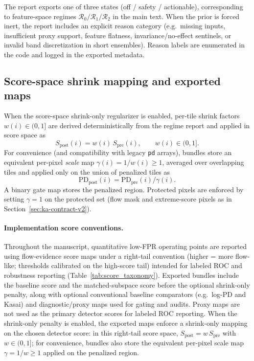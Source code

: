 \documentclass[11pt]{article}
\DeclareRobustCommand{\path}[1]{\nolinkurl{#1}}
\newif\ifSUPPLEMENTONLY
\begin{document}
The report exports one of three states (off / safety / actionable), corresponding to feature-space regimes $\mathcal{R}_0/\mathcal{R}_1/\mathcal{R}_2$ in the main text. When the prior is forced inert, the report includes an explicit reason category (e.g.\ missing inputs, insufficient proxy support, feature flatness, invariance/no-effect sentinels, or invalid band discretization in short ensembles). Reason labels are enumerated in the code and logged in the exported metadata.

\subsection{Score-space shrink mapping and exported maps}
When the score-space shrink-only regularizer is enabled, per-tile shrink factors $w(i)\in(0,1]$ are derived deterministically from the regime report and applied in score space as
\[
S_{\mathrm{post}}(i)=w(i)\,S_{\mathrm{pre}}(i),\qquad w(i)\in(0,1].
\]
For convenience (and compatibility with legacy \path{pd} arrays), bundles store an equivalent per-pixel \emph{scale} map $\gamma(i)=1/w(i)\ge 1$, averaged over overlapping tiles and applied only on the union of penalized tiles as
\[
\mathrm{PD}_{\mathrm{post}}(i)=\mathrm{PD}_{\mathrm{pre}}(i)/\gamma(i).
\]
A binary gate map stores the penalized region. Protected pixels are enforced by setting $\gamma=1$ on the protected set (flow mask and extreme-score pixels as in \ifSUPPLEMENTONLY the main paper\else Section~\ref{sec:ka-contract-v2}\fi).

\paragraph{Implementation score conventions.}
Throughout the manuscript, quantitative low-FPR operating points are reported using flow-evidence score maps under a right-tail convention (higher = more flow-like; thresholds calibrated on the high-score tail) intended for labeled ROC and robustness reporting (Table~\ref{tab:score_taxonomy}). Exported bundles include the baseline score and the matched-subspace score before the optional shrink-only penalty, along with optional conventional baseline comparators (e.g.\ log-PD and Kasai) and diagnostic/proxy maps used for gating and audits. Proxy maps are not used as the primary detector scores for labeled ROC reporting. When the shrink-only penalty is enabled, the exported maps enforce a shrink-only mapping on the chosen detector score: in this right-tail score space, $S_{\mathrm{post}}=w\,S_{\mathrm{pre}}$ with $w\in(0,1]$; for convenience, bundles also store the equivalent per-pixel scale map $\gamma=1/w\ge 1$ applied on the penalized region.
\end{document}
